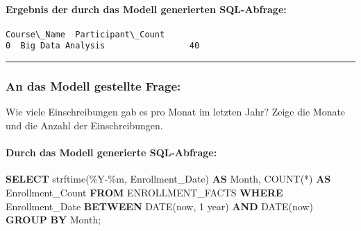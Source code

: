 \documentclass[11pt]{article}
\newenvironment{Shaded}{}{}
\newcommand{\KeywordTok}[1]{\textcolor[rgb]{0.00,0.44,0.13}{\textbf{{#1}}}}
\newcommand{\DataTypeTok}[1]{\textcolor[rgb]{0.56,0.13,0.00}{{#1}}}
\newcommand{\StringTok}[1]{\textcolor[rgb]{0.25,0.44,0.63}{{#1}}}
\newcommand{\FunctionTok}[1]{\textcolor[rgb]{0.02,0.16,0.49}{{#1}}}
\newcommand{\NormalTok}[1]{{#1}}
\newcommand{\OperatorTok}[1]{\textcolor[rgb]{0.40,0.40,0.40}{{#1}}}
\begin{document}
    
    \hypertarget{ergebnis-der-durch-das-modell-generierten-sql-abfrage}{%
\paragraph{Ergebnis der durch das Modell generierten
SQL-Abfrage:}\label{ergebnis-der-durch-das-modell-generierten-sql-abfrage}}

    
    
    \begin{Verbatim}[commandchars=\\\{\}]
         Course\_Name  Participant\_Count
0  Big Data Analysis                 40
    \end{Verbatim}

    
    \begin{center}\rule{0.5\linewidth}{0.5pt}\end{center}

    
    \hypertarget{an-das-modell-gestellte-frage}{%
\subsubsection{An das Modell gestellte
Frage:}\label{an-das-modell-gestellte-frage}}

Wie viele Einschreibungen gab es pro Monat im letzten Jahr? Zeige die
Monate und die Anzahl der Einschreibungen.

    
    \hypertarget{durch-das-modell-generierte-sql-abfrage}{%
\paragraph{Durch das Modell generierte
SQL-Abfrage:}\label{durch-das-modell-generierte-sql-abfrage}}

\begin{Shaded}
\begin{Highlighting}[]
\KeywordTok{SELECT}\NormalTok{ strftime(}\StringTok{\textquotesingle{}\%Y{-}\%m\textquotesingle{}}\NormalTok{, Enrollment\_Date) }\KeywordTok{AS} \DataTypeTok{Month}\NormalTok{, }\FunctionTok{COUNT}\NormalTok{(}\OperatorTok{*}\NormalTok{) }\KeywordTok{AS}\NormalTok{ Enrollment\_Count }
\KeywordTok{FROM}\NormalTok{ ENROLLMENT\_FACTS }
\KeywordTok{WHERE}\NormalTok{ Enrollment\_Date }\KeywordTok{BETWEEN} \DataTypeTok{DATE}\NormalTok{(}\StringTok{\textquotesingle{}now\textquotesingle{}}\NormalTok{, }\StringTok{\textquotesingle{}{-}1 year\textquotesingle{}}\NormalTok{) }\KeywordTok{AND} \DataTypeTok{DATE}\NormalTok{(}\StringTok{\textquotesingle{}now\textquotesingle{}}\NormalTok{) }
\KeywordTok{GROUP} \KeywordTok{BY} \DataTypeTok{Month}\NormalTok{;}
\end{Highlighting}
\end{Shaded}
\end{document}
